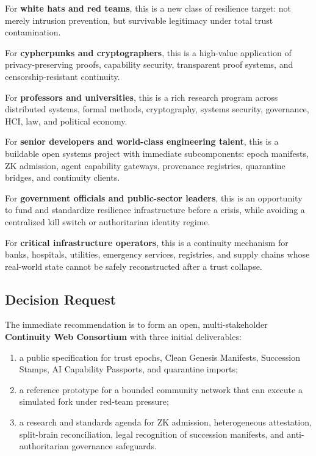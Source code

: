 \documentclass[11pt,letterpaper]{article}
\newcommand{\Term}[1]{\textbf{#1}}
\begin{document}
For \Term{white hats and red teams}, this is a new class of resilience target: not merely intrusion prevention, but survivable legitimacy under total trust contamination.

For \Term{cypherpunks and cryptographers}, this is a high-value application of privacy-preserving proofs, capability security, transparent proof systems, and censorship-resistant continuity.

For \Term{professors and universities}, this is a rich research program across distributed systems, formal methods, cryptography, systems security, governance, HCI, law, and political economy.

For \Term{senior developers and world-class engineering talent}, this is a buildable open systems project with immediate subcomponents: epoch manifests, ZK admission, agent capability gateways, provenance registries, quarantine bridges, and continuity clients.

For \Term{government officials and public-sector leaders}, this is an opportunity to fund and standardize resilience infrastructure before a crisis, while avoiding a centralized kill switch or authoritarian identity regime.

For \Term{critical infrastructure operators}, this is a continuity mechanism for banks, hospitals, utilities, emergency services, registries, and supply chains whose real-world state cannot be safely reconstructed after a trust collapse.

\subsection{Decision Request}

The immediate recommendation is to form an open, multi-stakeholder \Term{Continuity Web Consortium} with three initial deliverables:

\begin{enumerate}[leftmargin=1.6em]
\item a public specification for trust epochs, Clean Genesis Manifests, Succession Stamps, AI Capability Passports, and quarantine imports;
\item a reference prototype for a bounded community network that can execute a simulated fork under red-team pressure;
\item a research and standards agenda for ZK admission, heterogeneous attestation, split-brain reconciliation, legal recognition of succession manifests, and anti-authoritarian governance safeguards.
\end{enumerate}
\end{document}
